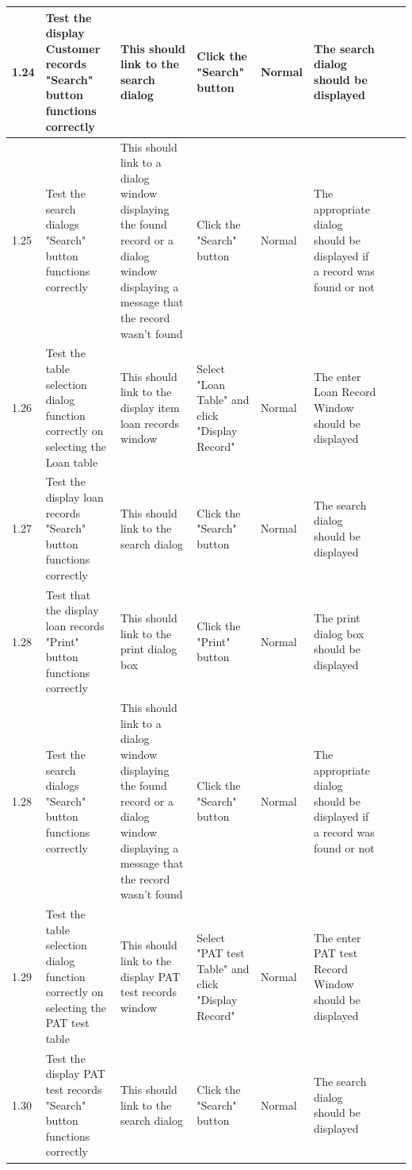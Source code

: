 \begin{landscape}
\begin{center}
\begin{longtable}{|p{1.5cm}|p{2cm}|p{3cm}|p{2cm}|p{2cm}|p{2.5cm}|p{2cm}|p{2cm}|}
        1.24 & Test the display Customer records "Search" button functions correctly & This should link to the search dialog & Click the "Search" button & Normal & The 
        search dialog should be displayed & & \\ \hline
        
        1.25 & Test the search dialogs "Search" button functions correctly & This should link to a dialog window displaying the found record or a dialog window 
        displaying a message that the record wasn't found & Click the "Search" button & Normal & The appropriate dialog should be displayed if a record was found or not
         & & \\ \hline

        1.26 & Test the table selection dialog function correctly on selecting the Loan table & This should link to the display item loan records window & Select "Loan 
        Table" and click "Display Record" & Normal & The enter Loan Record Window should be displayed & & \\ \hline
        
        1.27 & Test the display loan records "Search" button functions correctly & This should link to the search dialog & Click the "Search" button & Normal & The 
        search dialog should be displayed & & \\ \hline
        
        1.28 & Test that the display loan records "Print" button functions correctly & This should link to the print dialog box & Click the "Print" button & Normal & 
        The print dialog box should be displayed & & \\ \hline
        
        1.28 & Test the search dialogs "Search" button functions correctly & This should link to a dialog window displaying the found record or a dialog window 
        displaying a message that the record wasn't found & Click the "Search" button & Normal & The appropriate dialog should be displayed if a record was found or not
         & & \\ \hline
        
        1.29 & Test the table selection dialog function correctly on selecting the PAT test table & This should link to the display PAT test records window & Select 
        "PAT test Table" and click "Display Record" & Normal & The enter PAT test Record Window should be displayed & & \\ \hline
        
        1.30 & Test the display PAT test records "Search" button functions correctly & This should link to the search dialog & Click the "Search" button & Normal & The 
        search dialog should be displayed & & \\ \hline
        

\end{longtable}
\end{center}
\end{landscape}
